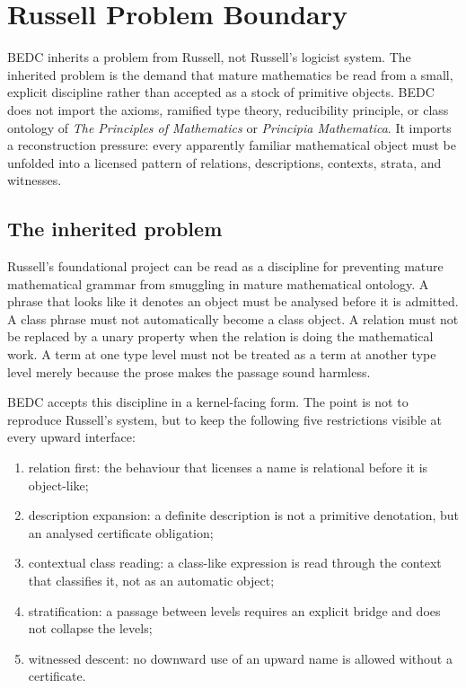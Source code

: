 \chapter{Russell Problem Boundary}
\label{ch:capstones-russell-problem-boundary}

BEDC inherits a problem from Russell, not Russell's logicist system. The inherited problem is the demand that mature mathematics be read from a small, explicit discipline rather than accepted as a stock of primitive objects. BEDC does not import the axioms, ramified type theory, reducibility principle, or class ontology of \emph{The Principles of Mathematics} or \emph{Principia Mathematica}. It imports a reconstruction pressure: every apparently familiar mathematical object must be unfolded into a licensed pattern of relations, descriptions, contexts, strata, and witnesses.

\section{The inherited problem}
\label{sec:russell-problem-inherited}

Russell's foundational project can be read as a discipline for preventing mature mathematical grammar from smuggling in mature mathematical ontology. A phrase that looks like it denotes an object must be analysed before it is admitted. A class phrase must not automatically become a class object. A relation must not be replaced by a unary property when the relation is doing the mathematical work. A term at one type level must not be treated as a term at another type level merely because the prose makes the passage sound harmless.

BEDC accepts this discipline in a kernel-facing form. The point is not to reproduce Russell's system, but to keep the following five restrictions visible at every upward interface:

\begin{enumerate}
  \item relation first: the behaviour that licenses a name is relational before it is object-like;
  \item description expansion: a definite description is not a primitive denotation, but an analysed certificate obligation;
  \item contextual class reading: a class-like expression is read through the context that classifies it, not as an automatic object;
  \item stratification: a passage between levels requires an explicit bridge and does not collapse the levels;
  \item witnessed descent: no downward use of an upward name is allowed without a certificate.
\end{enumerate}

